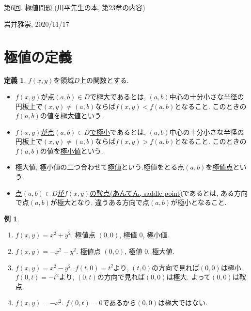 \documentclass[dvipdfmx,a4paper,11pt]{article}
\theoremstyle{definition}
\newtheorem{dfn}[thm]{定義}
\newtheorem{exa}[thm]{例}
\begin{document}
\newpage
\begin{center}
{\Large 第6回. 極値問題 (川平先生の本, 第23章の内容)}
\end{center}

\begin{flushright}
 岩井雅崇, 2020/11/17
\end{flushright}

\section{極値の定義}
\begin{tcolorbox}[
    colback = white,
    colframe = green!35!black,
    fonttitle = \bfseries,
    breakable = true]
    \begin{dfn}
    $f(x,y)$を領域$D$上の関数とする.
\begin{itemize}
\item \underline{$f(x,y)$が点$(a,b)\in D$で極大}であるとは, $(a,b)$中心の十分小さな半径の円板上で$(x,y) \neq (a,b)$ならば$f(x,y) < f(a,b)$となること.
このときの$f(a,b)$の値を\underline{極大値}という.
\item \underline{$f(x,y)$が点$(a,b)\in D$で極小}であるとは, $(a,b)$中心の十分小さな半径の円板上で$(x,y) \neq (a,b)$ならば$f(x,y) > f(a,b)$となること.
このときの$f(a,b)$の値を\underline{極小値}という.
\item  極大値, 極小値の二つ合わせて\underline{極値}という.極値をとる点$(a,b)$を\underline{極値点}という.
\item \underline{点$(a,b)\in D$が$f(x,y)$の鞍点(あんてん, saddle point)}であるとは, ある方向で点$(a,b)$が極大となり, 違うある方向で点$(a,b)$が極小となること.
\end{itemize}
    \end{dfn}
    \end{tcolorbox}
    
\begin{exa}
\begin{enumerate}
\item $f(x,y)=x^2 + y^2$. 極値点 $(0,0)$, 極値 0, 極小値.
\item $f(x,y)=-x^2 - y^2$. 極値点 $(0,0)$, 極値 0, 極大値.
\item $f(x,y)=x^2 -y^2$.
$f(t,0) = t^2$より, $(t,0)$の方向で見れば$(0,0)$は極小.
$f(0,t) = -t^2$より, $(0,t)$の方向で見れば$(0,0)$は極大.
よって$(0,0)$は鞍点.
\item $f(x,y)=-x^2 $. $f(0,t) =0$であるから$(0,0)$は極大ではない. 
\end{enumerate}

\end{exa}
\end{document}

